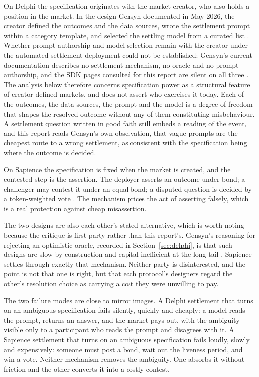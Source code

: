 On Delphi the specification originates with the market creator, who also holds a position in
the market. In the design Gensyn documented in May 2026, the creator defined the outcomes
and the data sources, wrote the settlement prompt within a category template, and selected
the settling model from a curated list \cite{gensyn2026delphi}. Whether prompt authorship
and model selection remain with the creator under the automated-settlement deployment could
not be established: Gensyn's current documentation describes no settlement mechanism, no
oracle and no prompt authorship, and the SDK pages consulted for this report are silent on
all three \cite{gensyn2026sdk}. The analysis below therefore concerns specification power
as a structural feature of creator-defined markets, and does not assert who exercises it
today. Each of the outcomes, the data sources, the prompt and the model is a degree of
freedom that shapes the resolved outcome without any of them constituting misbehaviour. A settlement question written in good
faith still embeds a reading of the event, and this report reads Gensyn's own observation, that vague
prompts are the cheapest route to a wrong settlement, as consistent with the specification
being where the outcome is decided.

On Sapience the specification is fixed when the market is created, and the contested step is
the assertion. The deployer asserts an outcome under bond; a challenger may contest it under
an equal bond; a disputed question is decided by a token-weighted vote
\cite{sapience2026relayer,uma2026oracle}. The mechanism prices the act of asserting
falsely, which is a real protection against cheap misassertion.

The two designs are also each other's stated alternative, which is worth noting because the
critique is first-party rather than this report's. Gensyn's reasoning for rejecting an
optimistic oracle, recorded in Section~\ref{sec:delphi}, is that such designs are slow by
construction and capital-inefficient at the long tail \cite{gensyn2026delphi}. Sapience
settles through exactly that mechanism. Neither party is disinterested, and the point is not
that one is right, but that each protocol's designers regard the other's resolution choice
as carrying a cost they were unwilling to pay.

The two failure modes are close to mirror images. A Delphi settlement that turns on an
ambiguous specification fails silently, quickly and cheaply: a model reads the prompt,
returns an answer, and the market pays out, with the ambiguity visible only to a participant
who reads the prompt and disagrees with it. A Sapience settlement that turns on an ambiguous
specification fails loudly, slowly and expensively: someone must post a bond, wait out the
liveness period, and win a vote. Neither mechanism removes the ambiguity. One absorbs it
without friction and the other converts it into a costly contest.


